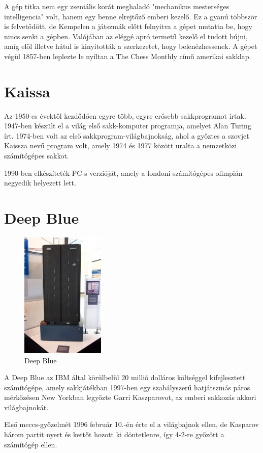 \documentclass[twoside, a4paper, 12pt]{book}
\begin{document}
A gép titka nem egy zseniális korát meghaladó "mechanikus mesterséges intelligencia" volt, hanem egy benne elrejtőző emberi kezelő. Ez a gyanú többször is felvetődött, de Kempelen a játszmák előtt felnyitva a gépet mutatta be, hogy nincs senki a gépben. Valójában az eléggé apró termetű kezelő el tudott bújni, amíg elöl illetve hátul is kinyitották a szerkezetet, hogy belenézhessenek. A gépet végül 1857-ben leplezte le nyíltan a The Chess Monthly című amerikai sakklap.\cite{MechanicalTurkHu}\cite{MechanicalTurkEn}\cite{CsodakKonyveHu}

\section{Kaissa}
Az 1950-es évektől kezdődően egyre több, egyre erősebb sakkprogramot írtak. 1947-ben készült el a világ első sakk-komputer programja, amelyet Alan Turing írt. 1974-ben volt az első sakkprogram-világbajnokság, ahol a győztes a szovjet Kaissza nevű program volt, amely 1974 és 1977 között uralta a nemzetközi számítógépes sakkot.\cite{chessProgramsHu}

1990-ben elkészíteték PC-s verzióját, amely a londoni számítógépes olimpián negyedik helyezett lett.\cite{KaissaEn}

\section{Deep Blue}
\begin{figure}
	\caption{Deep Blue}
	\label{fig:deepblue}
	\includegraphics[width=4.0cm]{img/deepblue.jpg}
\end{figure}
A Deep Blue az IBM által körülbelül 20 millió dolláros költséggel kifejlesztett számítógépe, amely sakkjátékban 1997-ben egy szabályszerű hatjátszmás páros mérkőzésen New Yorkban legyőzte Garri Kaszparovot, az emberi sakkozás akkori világbajnokát.

Első meccs-győzelmét 1996 február 10.-én érte el a világbajnok ellen, de Kasparov három partit nyert és kettőt hozott ki döntetlenre, így 4-2-re győzött a számítógép ellen.
\end{document}
